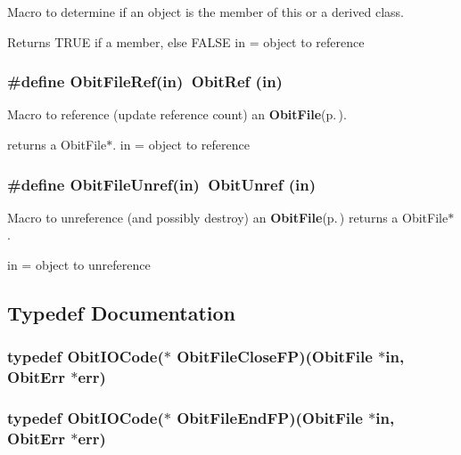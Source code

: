 Macro to determine if an object is the member of this or a derived class. 

Returns TRUE if a member, else FALSE in = object to reference 
\subsubsection{\setlength{\rightskip}{0pt plus 5cm}\#define Obit\-File\-Ref(in)\ Obit\-Ref (in)}\label{ObitFile_8h_a1}


Macro to reference (update reference count) an {\bf Obit\-File}{\rm (p.\,\pageref{structObitFile})}. 

returns a Obit\-File$\ast$. in = object to reference 
\subsubsection{\setlength{\rightskip}{0pt plus 5cm}\#define Obit\-File\-Unref(in)\ Obit\-Unref (in)}\label{ObitFile_8h_a0}


Macro to unreference (and possibly destroy) an {\bf Obit\-File}{\rm (p.\,\pageref{structObitFile})} returns a Obit\-File$\ast$. 

in = object to unreference 

\subsection{Typedef Documentation}
\subsubsection{\setlength{\rightskip}{0pt plus 5cm}typedef Obit\-IOCode($\ast$ {\bf Obit\-File\-Close\-FP})({\bf Obit\-File} $\ast$in, {\bf Obit\-Err} $\ast$err)}\label{ObitFile_8h_a8}


\subsubsection{\setlength{\rightskip}{0pt plus 5cm}typedef Obit\-IOCode($\ast$ {\bf Obit\-File\-End\-FP})({\bf Obit\-File} $\ast$in, {\bf Obit\-Err} $\ast$err)}\label{ObitFile_8h_a10}


